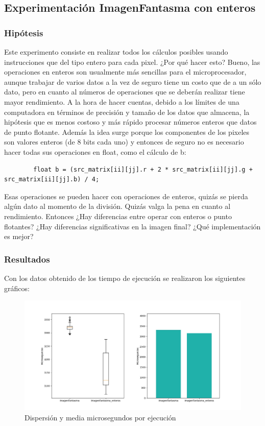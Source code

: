 \subsection{Experimentación ImagenFantasma con enteros}
\subsubsection{Hipótesis}
Este experimento consiste en realizar todos los cálculos posibles usando instrucciones que del tipo entero para cada pixel.
¿Por qué hacer esto? Bueno, las operaciones en enteros son usualmente más sencillas para el microprocesador, aunque trabajar de varios datos a la vez de seguro tiene un costo que de a un sólo dato, pero en cuanto al números de operaciones que se deberán realizar tiene mayor rendimiento.
A la hora de hacer cuentas, debido a los límites de una computadora en términos de precisión y tamaño de los datos que almacena, la hipótesis que es menos costoso y más rápido procesar números enteros que datos de punto flotante.
Además la idea surge porque los componentes de los pixeles son valores enteros (de 8 bits cada uno) y entonces de seguro no es necesario hacer todas sus operaciones en float, como el cálculo de b:
\begin{codesnippet}
\begin{verbatim}
        float b = (src_matrix[ii][jj].r + 2 * src_matrix[ii][jj].g + src_matrix[ii][jj].b) / 4;
\end{verbatim}
\end{codesnippet}
Esas operaciones se pueden hacer con operaciones de enteros, quizás se pierda algún dato al momento de la división. Quizás valga la pena en cuanto al rendimiento.
Entonces ¿Hay diferencias entre operar con enteros o punto flotantes? ¿Hay diferencias significativas en la imagen final? ¿Qué implementación es mejor?


\subsubsection{Resultados}
Con los datos obtenido de los tiempo de ejecución se realizaron los siguientes gráficos:

\begin{figure}[hb]
    \begin{center}
	\includegraphics[scale=0.50]{img/enteros1.jpeg}
	\end{center}
	\caption{Dispersión y media microsegundos por ejecución}
	\label{exp1_m}
\end{figure}

